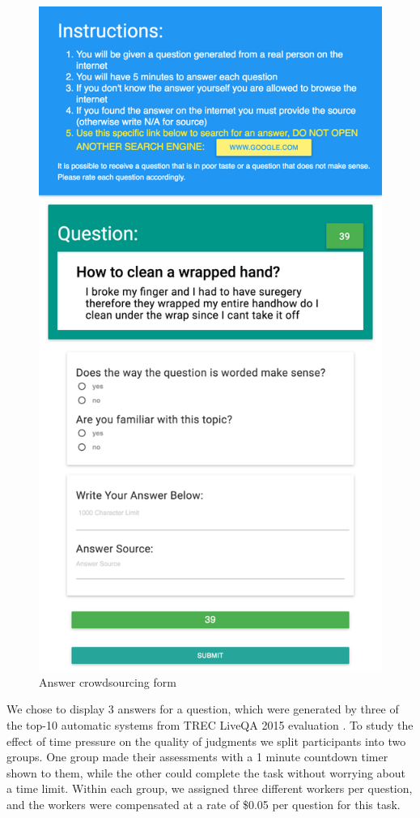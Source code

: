 \documentclass[11pt,letterpaper]{article}
\begin{document}
\begin{figure}[h!]
\centering
\includegraphics[width=0.75\linewidth]{img/answering_screenshot2}
\caption{Answer crowdsourcing form}
\label{fig:interfaces:answer}
\vspace{-7mm}
\end{figure}


We chose to display 3 answers for a question, which were generated by three of the top-10 automatic systems from TREC LiveQA 2015 evaluation \cite{overviewliveqa15}.
To study the effect of time pressure on the quality of judgments we split participants into two groups. One group made their assessments with a 1 minute countdown timer shown to them, while the other could complete the task without worrying about a time limit.
Within each group, we assigned three different workers per question, and the workers were compensated at a rate of \$0.05 per question for this task.
\end{document}
